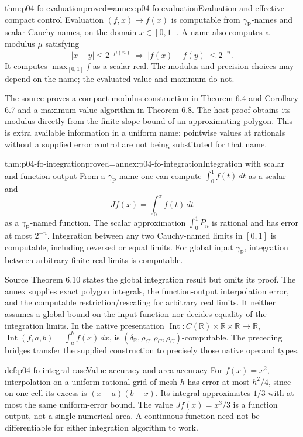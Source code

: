 \begin{hbtheorem}{thm:p04-fo-evaluation}{proved=annex:p04-fo-evaluation}{Evaluation and effective compact control}
Evaluation \( (f,x)\mapsto f(x)\) is computable from
\(\gamma_{\mathrm P}\)-names and scalar Cauchy names,
on the domain \(x\in[0,1]\).
A name also computes a modulus \(\mu\) satisfying
\[
 |x-y|\leq2^{-\mu(n)}
 \ \Longrightarrow\
 |f(x)-f(y)|\leq2^{-n}.
\]
It computes \(\max_{[0,1]}f\) as a scalar real.
The modulus and precision choices may depend on the name;
the evaluated value and maximum do not.
\end{hbtheorem}

The source proves a compact modulus construction in
Theorem 6.4 and Corollary 6.7 and a maximum-value algorithm
in Theorem 6.8. The host proof obtains its modulus directly
from the finite slope bound of an approximating polygon.
This is extra available information in a uniform name;
pointwise values at rationals without a supplied error control
are not being substituted for that name.

\begin{hbtheorem}{thm:p04-fo-integration}{proved=annex:p04-fo-integration}{Integration with scalar and function output}
From a \(\gamma_{\mathrm P}\)-name one can compute
\(\int_0^1f(t)\,dt\) as a scalar and
\[
 Jf(x)=\int_0^x f(t)\,dt
\]
as a \(\gamma_{\mathrm P}\)-named function.
The scalar approximation \(\int_0^1P_n\) is rational and
has error at most \(2^{-n}\).
Integration between any two Cauchy-named limits in
\([0,1]\) is computable, including reversed or equal limits.
For global input \(\gamma_{\mathbb R}\), integration between
arbitrary finite real limits is computable.
\end{hbtheorem}

Source Theorem 6.10 states the global integration result but
omits its proof. The annex supplies exact polygon integrals,
the function-output interpolation error, and the computable
restriction/rescaling for arbitrary real limits.
It neither assumes a global bound on the input function
nor decides equality of the integration limits.
In the native presentation
\(\operatorname{Int}:C(\mathbb R)\times\mathbb R\times
\mathbb R\to\mathbb R\),
\(\operatorname{Int}(f,a,b)=\int_a^bf(x)\,dx\), is
\((\delta_{\mathbb R},\rho_C,\rho_C,\rho_C)\)-computable.
The preceding bridges transfer the supplied construction
to precisely those native operand types.

\begin{hbexample}{def:p04-fo-integral-case}{Value accuracy and area accuracy}
For \(f(x)=x^2\), interpolation on a uniform rational grid
of mesh \(h\) has error at most \(h^2/4\), since on one
cell its excess is \((x-a)(b-x)\).
Its integral approximates \(1/3\) with at most the same
uniform-error bound. The value \(Jf(x)=x^3/3\) is a
function output, not a single numerical area.
A continuous function need not be differentiable for either
integration algorithm to work.
\end{hbexample}

